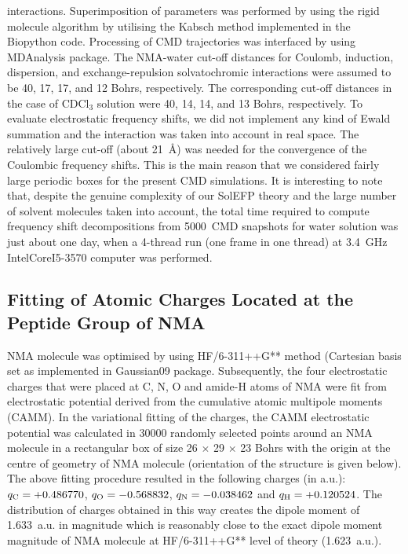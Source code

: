 \documentclass[a4paper,titlepage,twoside,fleqn,12pt]{book}
\begin{document}
\begin{appendices}
\begin{refsection}
interactions. Superimposition of parameters was performed by
using the rigid molecule algorithm \citep{Blasiak.Lee.Cho.JCP.2013} 
by utilising the Kabsch
method \citep{Kabsch.ActCrystSecA.1976} 
implemented in the {\sc Biopython} code. \citep{Biopython.Bioinformatics.2009}
Processing
of CMD trajectories was interfaced by using {\sc MDAnalysis}
package. \citep{MDAnalysis.JCC.2011} 
The NMA\hyp{}water cut\hyp{}off distances for Coulomb,
induction, dispersion, and exchange\hyp{}repulsion solvatochromic
interactions were assumed to be 40, 17, 17, and 12 Bohrs,
respectively. The corresponding cut\hyp{}off distances in the case of
CDCl$_3$ solution were 40, 14, 14, and 13 Bohrs, respectively. To
evaluate electrostatic frequency shifts, we did not implement
any kind of Ewald summation and the interaction was taken
into account in real space. The relatively large cut\hyp{}off (about
21~\AA) was needed for the convergence of the Coulombic
frequency shifts. This is the main reason that we considered
fairly large periodic boxes for the present CMD simulations. It is
interesting to note that, despite the genuine complexity of our
SolEFP theory and the large number of solvent molecules
taken into account, the total time required to compute
frequency shift decompositions from 5000~CMD snapshots for
water solution was just about one day, when a 4\hyp{}thread run (one
frame in one thread) at 3.4~GHz Intel\textregistered Core\texttrademark I5\hyp{}3570 computer
was performed.

\subsection{Fitting of Atomic Charges Located at the Peptide Group of NMA\label{a:nma-esp-fit}}

NMA molecule was optimised by using HF/6-311++G** method (Cartesian basis set
as implemented in {\sc Gaussian09} package. Subsequently, the four
electrostatic charges that were placed at C, N, O and amide-H atoms of NMA were fit from
electrostatic potential derived from the cumulative atomic multipole moments (CAMM). In
the variational fitting of the charges, the CAMM electrostatic potential was calculated in
30000 randomly selected points around an NMA molecule in a rectangular box of size 
26 $\times$ 29 $\times$ 23 Bohrs with the origin at the centre of geometry of NMA molecule (orientation of the
structure is given below). The above fitting procedure resulted in the following charges (in
a.u.): $q_{\rm C}=+0.486770$, $q_{\rm O}=-0.568832$, $q_{\rm N}=-0.038462$ and 
$q_{\rm H}=+0.120524$. The distribution of
charges obtained in this way creates the dipole moment of 1.633~a.u. in magnitude which is
reasonably close to the exact dipole moment magnitude of NMA molecule at 
HF/6-311++G** level of theory (1.623~a.u.).


\end{refsection}
\end{appendices}
\end{document}
